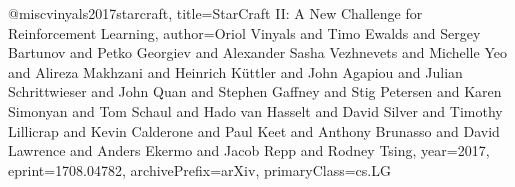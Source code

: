 @misc{vinyals2017starcraft,
      title={StarCraft II: A New Challenge for Reinforcement Learning}, 
      author={Oriol Vinyals and Timo Ewalds and Sergey Bartunov and Petko Georgiev and Alexander Sasha Vezhnevets and Michelle Yeo and Alireza Makhzani and Heinrich Küttler and John Agapiou and Julian Schrittwieser and John Quan and Stephen Gaffney and Stig Petersen and Karen Simonyan and Tom Schaul and Hado van Hasselt and David Silver and Timothy Lillicrap and Kevin Calderone and Paul Keet and Anthony Brunasso and David Lawrence and Anders Ekermo and Jacob Repp and Rodney Tsing},
      year={2017},
      eprint={1708.04782},
      archivePrefix={arXiv},
      primaryClass={cs.LG}
}